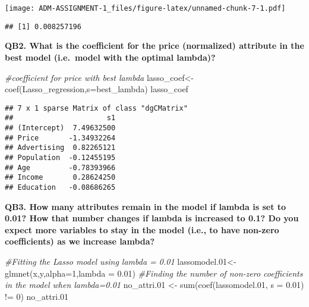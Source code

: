 \documentclass[
]{article}
\newenvironment{Shaded}{\begin{snugshade}}{\end{snugshade}}
\newcommand{\AttributeTok}[1]{\textcolor[rgb]{0.77,0.63,0.00}{#1}}
\newcommand{\CommentTok}[1]{\textcolor[rgb]{0.56,0.35,0.01}{\textit{#1}}}
\newcommand{\DecValTok}[1]{\textcolor[rgb]{0.00,0.00,0.81}{#1}}
\newcommand{\FloatTok}[1]{\textcolor[rgb]{0.00,0.00,0.81}{#1}}
\newcommand{\FunctionTok}[1]{\textcolor[rgb]{0.00,0.00,0.00}{#1}}
\newcommand{\NormalTok}[1]{#1}
\newcommand{\OtherTok}[1]{\textcolor[rgb]{0.56,0.35,0.01}{#1}}
\newcommand{\SpecialCharTok}[1]{\textcolor[rgb]{0.00,0.00,0.00}{#1}}
\begin{document}
\texttt{[image: ADM-ASSIGNMENT-1\_files/figure-latex/unnamed-chunk-7-1.pdf]}

\begin{Shaded}
\end{Shaded}

\begin{verbatim}
## [1] 0.008257196
\end{verbatim}

\textbf{QB2. What is the coefficient for the price (normalized)
attribute in the best model (i.e.~model with the optimal lambda)?}

\begin{Shaded}
\begin{Highlighting}[]
\CommentTok{\#coefficient for price with best lambda}
\NormalTok{lasso\_coef}\OtherTok{\textless{}{-}}\FunctionTok{coef}\NormalTok{(Lasso\_regression,}\AttributeTok{s=}\NormalTok{best\_lambda)}
\NormalTok{lasso\_coef}
\end{Highlighting}
\end{Shaded}

\begin{verbatim}
## 7 x 1 sparse Matrix of class "dgCMatrix"
##                      s1
## (Intercept)  7.49632500
## Price       -1.34932264
## Advertising  0.82265121
## Population  -0.12455195
## Age         -0.78393966
## Income       0.28624250
## Education   -0.08686265
\end{verbatim}

\textbf{QB3. How many attributes remain in the model if lambda is set to
0.01? How that number changes if lambda is increased to 0.1? Do you
expect more variables to stay in the model (i.e., to have non-zero
coefficients) as we increase lambda?}

\begin{Shaded}
\begin{Highlighting}[]
\CommentTok{\#Fitting the Lasso model using lambda = 0.01}
\NormalTok{lassomodel}\FloatTok{.01}\OtherTok{\textless{}{-}} \FunctionTok{glmnet}\NormalTok{(x,y,}\AttributeTok{alpha=}\DecValTok{1}\NormalTok{,}\AttributeTok{lambda =} \FloatTok{0.01}\NormalTok{)}
\CommentTok{\#Finding the number of non{-}zero coefficients in the model when lambda=0.01}
\NormalTok{no\_attri}\FloatTok{.01} \OtherTok{\textless{}{-}} \FunctionTok{sum}\NormalTok{(}\FunctionTok{coef}\NormalTok{(lassomodel}\FloatTok{.01}\NormalTok{, }\AttributeTok{s =} \FloatTok{0.01}\NormalTok{) }\SpecialCharTok{!=} \DecValTok{0}\NormalTok{)}
\NormalTok{no\_attri}\FloatTok{.01}
\end{Highlighting}
\end{Shaded}
\end{document}
